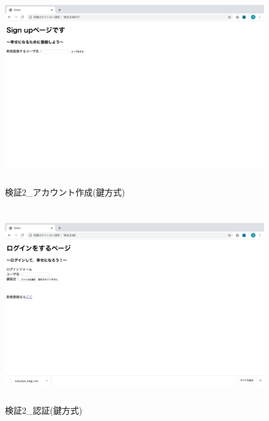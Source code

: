     \vspace{4cm}%
    \begin{figure}[H]
        \includegraphics[height=8.4cm]{./fig/chapter4/inspect_2/key_screnn/sign_up.png}
        \caption{検証2\_アカウント作成(鍵方式)}
        \label{検証２アカウント作成(鍵方式)}
    \end{figure}

    \vspace{4cm}%
    \begin{figure}[H]
        \includegraphics[height=8.4cm]{./fig/chapter4/inspect_2/key_screnn/login.png}
        \caption{検証2\_認証(鍵方式)}
        \label{検証２認証(鍵方式)}
    \end{figure}

